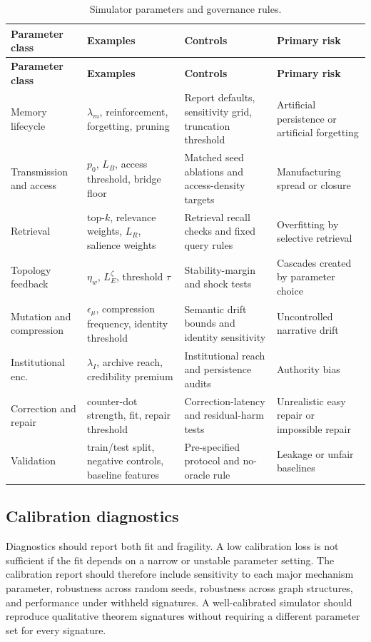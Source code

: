 \documentclass[11pt]{article}
\theoremstyle{remark}
\begin{document}
{\scriptsize
\begin{longtable}{@{}L{0.16\textwidth}L{0.24\textwidth}L{0.21\textwidth}L{0.18\textwidth}@{}}
\caption{Simulator parameters and governance rules.}\label{tab:simulator-parameter-governance}\\
\toprule
\textbf{Parameter class} & \textbf{Examples} & \textbf{Controls} & \textbf{Primary risk}\\
\midrule
\endfirsthead
\toprule
\textbf{Parameter class} & \textbf{Examples} & \textbf{Controls} & \textbf{Primary risk}\\
\midrule
\endhead
Memory lifecycle & $\lambda_m$, reinforcement, forgetting, pruning & Report defaults, sensitivity grid, truncation threshold & Artificial persistence or artificial forgetting\\
Transmission and access & $p_0$, $L_B$, access threshold, bridge floor & Matched seed ablations and access-density targets & Manufacturing spread or closure\\
Retrieval & top-$k$, relevance weights, $L_R$, salience weights & Retrieval recall checks and fixed query rules & Overfitting by selective retrieval\\
Topology feedback & $\eta_w$, $L_E^\zeta$, threshold $\tau$ & Stability-margin and shock tests & Cascades created by parameter choice\\
Mutation and compression & $\epsilon_\mu$, compression frequency, identity threshold & Semantic drift bounds and identity sensitivity & Uncontrolled narrative drift\\
Institutional enc. & $\lambda_I$, archive reach, credibility premium & Institutional reach and persistence audits & Authority bias\\
Correction and repair & counter-dot strength, fit, repair threshold & Correction-latency and residual-harm tests & Unrealistic easy repair or impossible repair\\
Validation & train/test split, negative controls, baseline features & Pre-specified protocol and no-oracle rule & Leakage or unfair baselines\\
\bottomrule
\end{longtable}
}

\subsection{Calibration diagnostics}\label{calibration-diagnostics}

Diagnostics should report both fit and fragility. A low calibration loss is not sufficient if the fit depends on a narrow or unstable parameter setting. The calibration report should therefore include sensitivity to each major mechanism parameter, robustness across random seeds, robustness across graph structures, and performance under withheld signatures. A well-calibrated simulator should reproduce qualitative theorem signatures without requiring a different parameter set for every signature.
\end{document}
